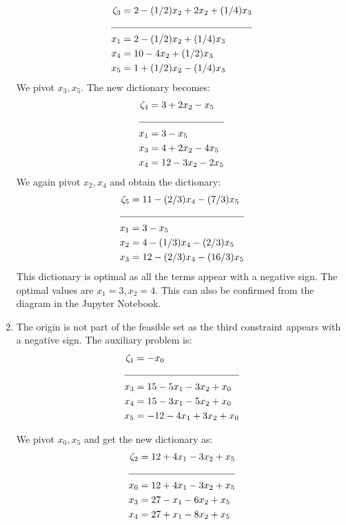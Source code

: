 \documentclass[letterpaper,12pt]{article}
\theoremstyle{definition}
\begin{document}
\begin{enumerate}
  \begin{align*}
    \zeta_3 &= 2 -(1/2)x_2+2x_2+(1/4)x_3\\
    \cline{1-2}
    x_1 &= 2 - (1/2)x_2 + (1/4)x_3\\
    x_4 &= 10 - 4x_2 +(1/2)x_3\\
    x_5 &= 1 + (1/2)x_2 - (1/4)x_3\\
  \end{align*}
  We pivot $x_3, x_5$. The new dictionary becomes:
  \begin{align*}
    \zeta_4 &= 3+2x_2-x_5\\
    \cline{1-2}
    x_1 &= 3 - x_5\\
    x_3 &= 4+2x_2-4x_5\\
    x_4 &=12-3x_2-2x_5\\
  \end{align*}
We again pivot $x_2, x_4$ and obtain the dictionary:
\begin{align*}
  \zeta_5 &= 11- (2/3)x_4- (7/3)x_5\\
  \cline{1-2}
  x_1 &= 3-x_5\\
  x_2 &= 4 - (1/3)x_4 - (2/3)x_5\\
  x_3 &= 12 - (2/3)x_4 - (16/3)x_5
\end{align*}
This dictionary is optimal as all the terms appear with a negative sign. The optimal values are $x_1=3, x_2=4$.
This can also be confirmed from the diagram in the Jupyter Notebook.

\item The origin is not part of the feasible set as the third constraint appears with a negative sign.
The auxiliary problem is:
\begin{align*}
  \zeta_1 &= -x_0\\
  \cline{1-2}
  x_3 &= 15-5x_1-3x_2+x_0\\
  x_4 &= 15-3x_1-5x_2+x_0\\
  x_5 &= -12 -4x_1+3x_2+x_0\\
\end{align*}

We pivot $x_0, x_5$ and get the new dictionary as:
\begin{align*}
  \zeta_2 &= 12+4x_1-3x_2+x_5\\
  \cline{1-2}
  x_0 &= 12+4x_1-3x_2+x_5\\
  x_3 &= 27-x_1 - 6x_2+x_5\\
  x_4 &= 27+x_1- 8x_2+x_5\\
\end{align*}


\end{enumerate}
\end{document}

